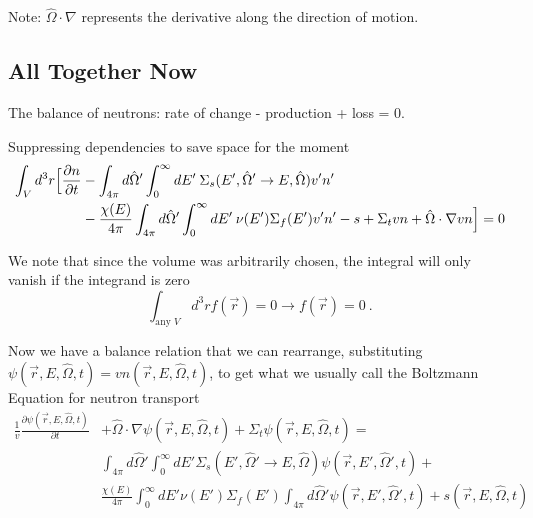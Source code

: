 \documentclass[12pt]{article}
\newlength{\up}
\newcommand{\vOmega}{\ensuremath{\hat{\Omega}}}
\begin{document}
Note: $\vOmega \cdot \nabla$ represents the derivative along the direction of motion.

\subsection*{All Together Now}
The balance of neutrons: rate of change - production + loss = 0.

Suppressing dependencies to save space for the moment
%
\begin{align}
\int_V d^3r \Bigl[\frac{\partial n}{\partial t} &- 
\int_{4\pi} d\vOmega' \int_0^{\infty} dE' \:\Sigma_s(E', \vOmega' \rightarrow E, \vOmega) v' n' \nonumber\\&-
\frac{\chi(E)}{4\pi} \int_{4\pi} d\vOmega' \int_0^{\infty} dE' \:\nu(E') \Sigma_f(E') v' n' -
s +
\Sigma_t v n + 
\vOmega \cdot \nabla v n \Bigr] = 0 \nonumber
\end{align}

We note that since the volume was arbitrarily chosen, the integral will only vanish if the integrand is zero 
\[\int_{\text{any }V} d^3r f(\vec{r}) = 0 \rightarrow f(\vec{r}) = 0 \:.\]

Now we have a balance relation that we can rearrange, substituting $\psi(\vec{r}, E, \vOmega, t) = vn(\vec{r}, E, \vOmega, t)$, to get what we usually call the Boltzmann Equation for neutron transport
%
\begin{align}
\frac{1}{v}\frac{\partial \psi(\vec{r}, E, \vOmega, t)}{\partial t} &+ 
\vOmega \cdot \nabla \psi(\vec{r}, E, \vOmega, t) +
\Sigma_t \psi(\vec{r}, E, \vOmega, t) = \nonumber\\
%
& \int_{4\pi} d\vOmega' \int_0^{\infty} dE' \Sigma_s(E', \vOmega' \rightarrow E, \vOmega) \psi(\vec{r}, E', \vOmega', t)  +\nonumber\\
%
& \frac{\chi(E)}{4\pi} \int_0^{\infty} dE' \nu(E') \Sigma_f(E') \int_{4\pi} d\vOmega' \psi(\vec{r}, E', \vOmega', t) +
s(\vec{r}, E, \vOmega, t) \nonumber
\end{align}

\end{document}
